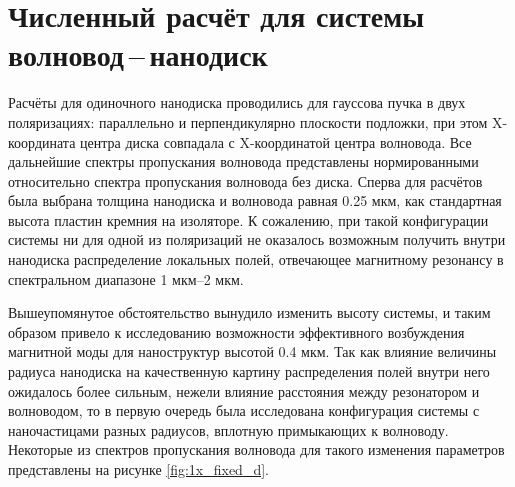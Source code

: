 \section{Численный расчёт для системы волновод\,--\,нанодиск}

Расчёты для одиночного нанодиска проводились для гауссова пучка в двух поляризациях: параллельно и перпендикулярно плоскости подложки, при этом X-координата центра диска совпадала с X-координатой центра волновода. Все дальнейшие спектры пропускания волновода представлены нормированными относительно спектра пропускания волновода без диска. Сперва для расчётов была выбрана толщина нанодиска и волновода равная 0.25 мкм, как стандартная высота пластин кремния на изоляторе. К сожалению, при такой конфигурации системы ни для одной из поляризаций не оказалось возможным получить внутри нанодиска распределение локальных полей, отвечающее магнитному резонансу в спектральном диапазоне 1 мкм--2 мкм.

Вышеупомянутое обстоятельство вынудило изменить высоту системы, и таким образом привело к исследованию возможности эффективного возбуждения магнитной моды для наноструктур высотой 0.4 мкм. Так как влияние величины радиуса нанодиска на качественную картину распределения полей внутри него ожидалось более сильным, нежели влияние расстояния между резонатором и волноводом, то в первую очередь была исследована конфигурация системы с наночастицами разных радиусов, вплотную примыкающих к волноводу. Некоторые из спектров пропускания волновода для такого изменения параметров представлены на рисунке \ref{fig:1x_fixed_d}.

